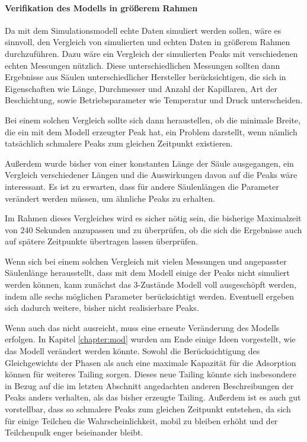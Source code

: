 
\paragraph{Verifikation des Modells in größerem Rahmen}
Da mit dem Simulationsmodell echte Daten simuliert werden sollen, wäre es sinnvoll, den Vergleich von simulierten und echten Daten in größerem Rahmen durchzuführen. Dazu wäre ein Vergleich der simulierten Peaks mit verschiedenen echten Messungen nützlich. Diese unterschiedlichen Messungen sollten dann Ergebnisse aus Säulen unterschiedlicher Hersteller berücksichtigen, die sich in Eigenschaften wie Länge, Durchmesser und Anzahl der Kapillaren, Art der Beschichtung, sowie Betriebsparameter wie Temperatur und Druck unterscheiden. 

Bei einem solchen Vergleich sollte sich dann heraustellen, ob die minimale Breite, die ein mit dem Modell erzeugter Peak hat, ein Problem darstellt, wenn nämlich tatsächlich schmalere Peaks zum gleichen Zeitpunkt existieren. 

Außerdem wurde bisher von einer konstanten Länge der Säule ausgegangen, ein Vergleich verschiedener Längen und die Auswirkungen davon auf die Peaks wäre interessant. Es ist zu erwarten, dass für andere Säulenlängen die Parameter verändert werden müssen, um ähnliche Peaks zu erhalten.

Im Rahmen dieses Vergleiches wird es sicher nötig sein, die bisherige Maximalzeit von $240$ Sekunden anzupassen und zu überprüfen, ob die sich die Ergebnisse auch auf spätere Zeitpunkte übertragen lassen überprüfen. 

Wenn sich bei einem solchen Vergleich mit vielen Messungen und angepasster Säulenlänge herausstellt, dass mit dem Modell einige der Peaks nicht simuliert werden können, kann zunächst das 3-Zustände Modell voll ausgeschöpft werden, indem alle sechs möglichen Parameter berücksichtigt werden. Eventuell ergeben sich dadurch weitere, bisher nicht realisierbare Peaks.

Wenn auch das nicht ausreicht, muss eine erneute Veränderung des Modells erfolgen.
In Kapitel \ref{chapter:mod} wurden am Ende einige Ideen vorgestellt, wie das Modell verändert werden könnte.
Sowohl die Berücksichtigung des Gleichgewichts der Phasen als auch eine maximale Kapazität für die Adsorption können für weiteres Tailing sorgen. Dieses neue Tailing könnte sich insbesondere in Bezug auf die im letzten Abschnitt angedachten anderen Beschreibungen der Peaks anders verhalten, als das bisher erzeugte Tailing. 
Außerdem ist es auch gut vorstellbar, dass so schmalere Peaks zum gleichen Zeitpunkt entstehen, da sich für einige Teilchen die Wahrscheinlichkeit, mobil zu bleiben erhöht und der Teilchenpulk enger beieinander bleibt.


